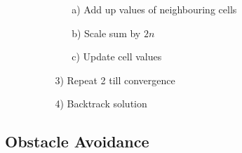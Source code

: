 \begin{itemize}
\begin{itemize}
\begin{itemize}
\begin{itemize}
                            \item[a)] Add up values of neighbouring cells
                            \item[b)] Scale sum by $2n$
                            \item[c)] Update cell values
                        \end{itemize}
                    \item[3)] Repeat 2 till convergence
                    \item[4)] Backtrack solution
                \end{itemize}
        \end{itemize}
\end{itemize}

\subsection{Obstacle Avoidance}
